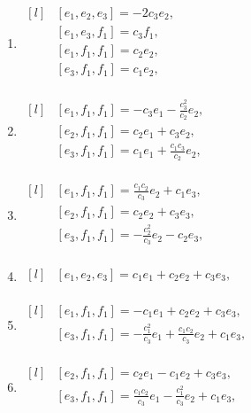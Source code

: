 \begin{adjustwidth*}{-0.5cm}{0cm}
\begin{multicols*}{2}
\begin{enumerate}
    \item $\begin{matrix*}[l]
            & [e_1, e_2, e_3] =  - 2 c_{3} e_2 , \\
            & [e_1, e_3, f_1] = c_{3} f_1, \\
            & [e_1, f_1, f_1] =  c_{2} e_2 , \\
            & [e_3, f_1, f_1] =  c_{1} e_2 , \\
        \end{matrix*}$

    \item $\begin{matrix*}[l]
            & [e_1, f_1, f_1] = -c_{3} e_1 - \frac{c_{3}^2}{c_{2}} e_2 , \\
            & [e_2, f_1, f_1] = c_{2} e_1 + c_{3} e_2 , \\
            & [e_3, f_1, f_1] = c_{1} e_1 + \frac{c_{1} c_{3}}{c_{2}} e_2 , \\
        \end{matrix*}$

    \item $\begin{matrix*}[l]
            & [e_1, f_1, f_1] =  \frac{c_{1} c_{2}}{c_{3}} e_2 + c_{1} e_3, \\
            & [e_2, f_1, f_1] =  c_{2} e_2 + c_{3} e_3, \\
            & [e_3, f_1, f_1] =  - \frac{c_{2}^2}{c_{3}} e_2 - c_{2} e_3, \\
        \end{matrix*}$

    \item $\begin{matrix*}[l]
            & [e_1, e_2, e_3] = c_{1} e_1 + c_{2} e_2 + c_{3} e_3, \\
        \end{matrix*}$

    \item $\begin{matrix*}[l]
            & [e_1, f_1, f_1] = -c_{1} e_1 + c_{2} e_2 + c_{3} e_3, \\
            & [e_3, f_1, f_1] = -\frac{c_{1}^2}{c_{3}} e_1 + \frac{c_{1} c_{2}}{c_{3}} e_2 + c_{1} e_3, \\
        \end{matrix*}$

    \item $\begin{matrix*}[l]
            & [e_2, f_1, f_1] = c_{2} e_1 - c_{1} e_2 + c_{3} e_3, \\
            & [e_3, f_1, f_1] = \frac{c_{1} c_{2}}{c_{3}} e_1 - \frac{c_{1}^2}{c_{3}} e_2 + c_{1} e_3, \\
        \end{matrix*}$


\end{enumerate}
\end{multicols*}
\end{adjustwidth*}
